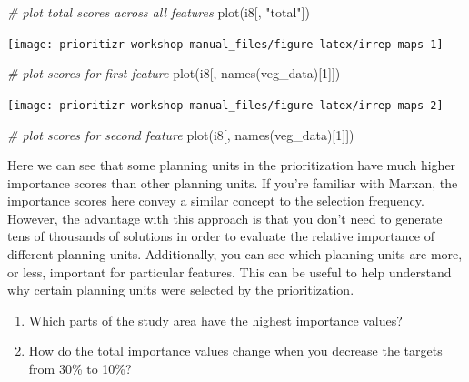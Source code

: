 \documentclass[
  12pt,
]{book}
\makeatletter
\newenvironment{Shaded}{\begin{snugshade}}{\end{snugshade}}
\newcommand{\CommentTok}[1]{\textcolor[rgb]{0.56,0.35,0.01}{\textit{#1}}}
\newcommand{\DecValTok}[1]{\textcolor[rgb]{0.00,0.00,0.81}{#1}}
\newcommand{\FunctionTok}[1]{\textcolor[rgb]{0.00,0.00,0.00}{#1}}
\newcommand{\NormalTok}[1]{#1}
\newcommand{\StringTok}[1]{\textcolor[rgb]{0.31,0.60,0.02}{#1}}
\providecommand{\tightlist}{%
  \setlength{\itemsep}{0pt}\setlength{\parskip}{0pt}}
\newenvironment{kframe}{%
\medskip{}
\setlength{\fboxsep}{.8em}
 \def\at@end@of@kframe{}%
 \ifinner\ifhmode%
  \def\at@end@of@kframe{\end{minipage}}%
  \begin{minipage}{\columnwidth}%
 \fi\fi%
 \def\FrameCommand##1{\hskip\@totalleftmargin \hskip-\fboxsep
 \colorbox{shadecolor}{##1}\hskip-\fboxsep
     \hskip-\linewidth \hskip-\@totalleftmargin \hskip\columnwidth}%
 \MakeFramed {\advance\hsize-\width
   \@totalleftmargin\z@ \linewidth\hsize
   \@setminipage}}%
 {\par\unskip\endMakeFramed%
 \at@end@of@kframe}
\newenvironment{rmdblock}[1]
  {
  \begin{itemize}
  \renewcommand{\labelitemi}{
    \raisebox{-.7\height}[0pt][0pt]{
      {\setkeys{Gin}{width=3em,keepaspectratio}\texttt{[image: images/\#1]}}
    }
  }
  \setlength{\fboxsep}{1em}
  \begin{kframe}
  \item
  }
  {
  \end{kframe}
  \end{itemize}
  }
\newenvironment{rmdquestion}
  {\begin{rmdblock}{question}}
  {\end{rmdblock}}
\makeatother
\begin{document}
\begin{Shaded}
\begin{Highlighting}[]
\CommentTok{\# plot total scores across all features}
\FunctionTok{plot}\NormalTok{(i8[, }\StringTok{"total"}\NormalTok{])}
\end{Highlighting}
\end{Shaded}

\begin{center}\texttt{[image: prioritizr-workshop-manual\_files/figure-latex/irrep-maps-1]} \end{center}

\begin{Shaded}
\begin{Highlighting}[]
\CommentTok{\# plot scores for first feature}
\FunctionTok{plot}\NormalTok{(i8[, }\FunctionTok{names}\NormalTok{(veg\_data)[}\DecValTok{1}\NormalTok{]])}
\end{Highlighting}
\end{Shaded}

\begin{center}\texttt{[image: prioritizr-workshop-manual\_files/figure-latex/irrep-maps-2]} \end{center}

\begin{Shaded}
\begin{Highlighting}[]
\CommentTok{\# plot scores for second feature}
\FunctionTok{plot}\NormalTok{(i8[, }\FunctionTok{names}\NormalTok{(veg\_data)[}\DecValTok{1}\NormalTok{]])}
\end{Highlighting}
\end{Shaded}

\clearpage

Here we can see that some planning units in the prioritization have much higher importance scores than other planning units. If you're familiar with Marxan, the importance scores here convey a similar concept to the selection frequency. However, the advantage with this approach is that you don't need to generate tens of thousands of solutions in order to evaluate the relative importance of different planning units. Additionally, you can see which planning units are more, or less, important for particular features. This can be useful to help understand why certain planning units were selected by the prioritization.

\begin{rmdquestion}
\begin{enumerate}
\def\labelenumi{\arabic{enumi}.}
\tightlist
\item
  Which parts of the study area have the highest importance values?
\item
  How do the total importance values change when you decrease the targets from 30\% to 10\%?
\end{enumerate}
\end{rmdquestion}
\end{document}
